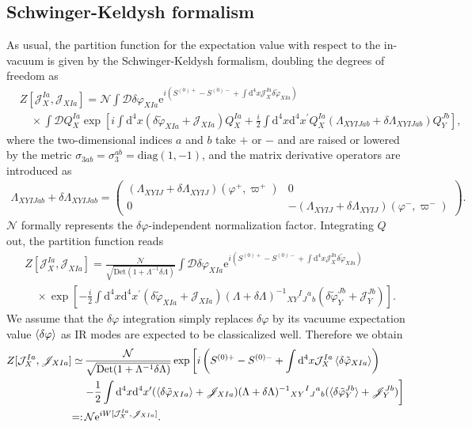 \documentclass[aps, prd
, preprint
, nofootinbib 
, notitlepage
, longbibliography
]{revtex4-1}
\newcommand{\dd}{\mathrm{d}}
\newcommand{\ee}{\mathrm{e}}
\newcommand{\diag}{\mathrm{diag}}
\newcommand{\Det}{\mathrm{Det}}
\newcommand{\scrD}{\mathscr{D}}
\newcommand{\calJ}{\mathcal{J}}
\newcommand{\scrJ}{\mathscr{J}}
\newcommand{\calN}{\mathcal{N}}
\newcommand{\bae}[1]{\begin{align} #1 \end{align}}
\newcommand{\bpme}[1]{\begin{pmatrix} #1 \end{pmatrix}}
\begin{document}
\subsection{Schwinger-Keldysh formalism}

As usual, the partition function for the expectation value with respect to the in-vacuum is given by the Schwinger-Keldysh formalism, doubling the degrees of freedom as
\bae{
    &Z[\calJ_X^{Ia},\scrJ_{XIa}]=\calN\int\scrD\delta\varphi_{XIa}\ee^{i(S^{(0)+}-S^{(0)-}+\int\dd^4x\calJ_X^{Ia}\delta\tilde{\varphi}_{XIa})} \nonumber \\
    &\quad\times\int\scrD Q^{Ia}_X\exp\left[i\int\dd^4x(\delta\tilde{\varphi}_{XIa}+\scrJ_{XIa})Q^{Ia}_X+\frac{i}{2}\int\dd^4x\dd^4x^\prime Q^{Ia}_X(\Lambda_{XYIJab}+\delta\Lambda_{XYIJab})Q^{Jb}_Y\right],
}
where the two-dimensional indices $a$ and $b$ take $+$ or $-$ and are raised or lowered by the metric $\sigma_{3ab}=\sigma_3^{ab}=\diag(1,-1)$, and the matrix derivative operators are introduced as
\bae{
    \Lambda_{XYIJab}+\delta\Lambda_{XYIJab}
    =\bpme{
        (\Lambda_{XYIJ}+\delta\Lambda_{XYIJ})(\varphi^+,\varpi^+) & 0 \\ 0 & -(\Lambda_{XYIJ}+\delta\Lambda_{XYIJ})(\varphi^-,\varpi^-)
    }.
}
$\calN$ formally represents the $\delta\varphi$-independent normalization factor.
Integrating $Q$ out, the partition function reads
\bae{
    &Z[\calJ^{Ia}_X,\scrJ_{XIa}]=\frac{\calN}{\sqrt{\Det(1+\Lambda^{-1}\delta\Lambda)}}\int\scrD\delta\varphi_{XIa}\ee^{i(S^{(0)+}-S^{(0)-}+\int\dd^4x\scrJ^{Ia}_X\delta\tilde{\varphi}_{XIa})} \nonumber \\
    &\quad\times\exp\left[-\frac{i}{2}\int\dd^4x\dd^4x^\prime(\delta\tilde{\varphi}_{XIa}+\scrJ_{XIa})(\Lambda+\delta\Lambda)^{-1}{}_{XY}{}^I{}_J{}^a{}_b(\delta\tilde{\varphi}_Y^{Jb}+\scrJ_Y^{Jb})\right].
}
We assume that the $\delta\varphi$ integration simply replaces $\delta\varphi$ by its vacuume expectation value $\braket{\delta\varphi}$ as IR modes are expected to be classicalized well.
Therefore we obtain
\bae{
    Z[\calJ^{Ia}_X,\scrJ_{XIa}]\simeq&\,\frac{\calN}{\sqrt{\Det(1+\Lambda^{-1}\delta\Lambda)}}\exp\left[i\left(S^{(0)+}-S^{(0)-}+\int\dd^4x\calJ_X^{Ia}\braket{\delta\tilde{\varphi}_{XIa}}\right)\right. \nonumber \\
    &\left.-\frac{1}{2}\int\dd^4x\dd^4x^\prime(\braket{\delta\tilde{\varphi}_{XIa}}+\scrJ_{XIa})(\Lambda+\delta\Lambda)^{-1}{}_{XY}{}^I{}_J{}^a{}_b(\braket{\delta\tilde{\varphi}_Y^{Jb}}+\scrJ_Y^{Jb})\right] \nonumber \\
    =:&\,\calN\ee^{iW[\calJ_X^{Ia},\scrJ_{XIa}]}.
}
\end{document}
